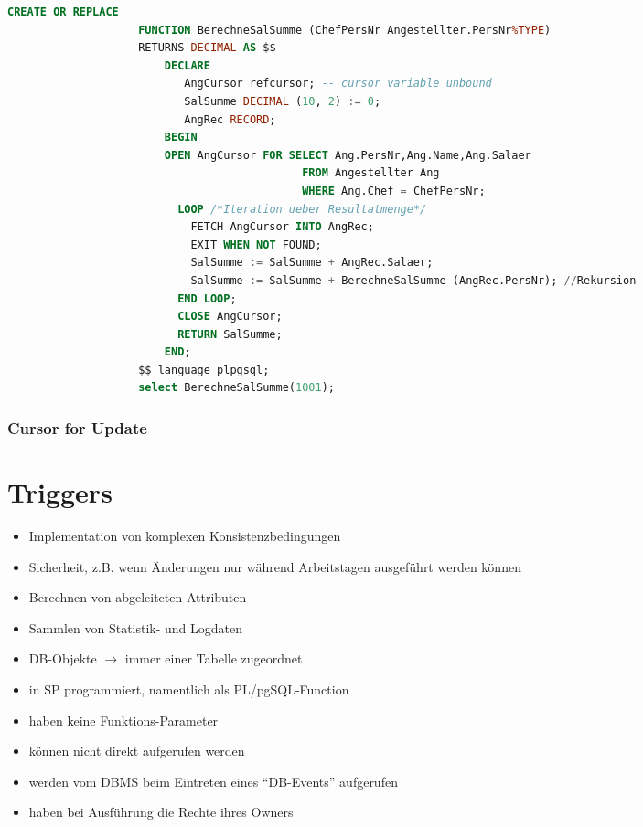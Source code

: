 \documentclass[a4paper, landscape, 8pt]{scrartcl}
\begin{document}
\begin{multicols*}{4}
        \begin{lstlisting}[language=sql]
                    CREATE OR REPLACE
                    FUNCTION BerechneSalSumme (ChefPersNr Angestellter.PersNr%TYPE)
                    RETURNS DECIMAL AS $$
                        DECLARE
                           AngCursor refcursor; -- cursor variable unbound
                           SalSumme DECIMAL (10, 2) := 0;
                           AngRec RECORD;
                        BEGIN
                        OPEN AngCursor FOR SELECT Ang.PersNr,Ang.Name,Ang.Salaer
                                             FROM Angestellter Ang
                                             WHERE Ang.Chef = ChefPersNr;
                          LOOP /*Iteration ueber Resultatmenge*/
                            FETCH AngCursor INTO AngRec;
                            EXIT WHEN NOT FOUND;
                            SalSumme := SalSumme + AngRec.Salaer;
                            SalSumme := SalSumme + BerechneSalSumme (AngRec.PersNr); //Rekursion
                          END LOOP;
                          CLOSE AngCursor;
                          RETURN SalSumme;
                        END;
                    $$ language plpgsql;
                    select BerechneSalSumme(1001);
        \end{lstlisting}

        \subsubsection{Cursor for Update}


        \section{Triggers}
        \begin{itemize}
            \item Implementation von komplexen Konsistenzbedingungen
            \item Sicherheit, z.B. wenn Änderungen nur während Arbeitstagen ausgeführt werden können
            \item Berechnen von abgeleiteten Attributen
            \item Sammlen von Statistik- und Logdaten
            \item DB-Objekte $\to$ immer einer Tabelle zugeordnet
            \item in SP programmiert, namentlich als PL/pgSQL-Function
            \item haben keine Funktions-Parameter
            \item können nicht direkt aufgerufen werden
            \item werden vom DBMS beim Eintreten eines \enquote{DB-Events} aufgerufen
            \item haben bei Ausführung die Rechte ihres Owners
        \end{itemize}


\end{multicols*}
\end{document}

